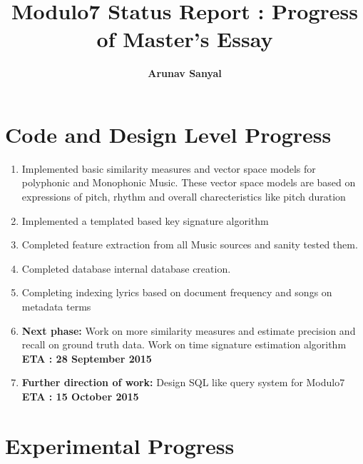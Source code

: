\documentclass[11pt]{article}
\begin{document}
\title{Modulo7 Status Report : Progress of Master's Essay}
\author{\textbf{Arunav Sanyal}}

\maketitle


\section*{Code and Design Level Progress}

\begin{enumerate}
\item Implemented basic similarity measures and vector space models for polyphonic and Monophonic Music. These vector space models are based on expressions of pitch, rhythm and overall charecteristics like pitch duration
\item Implemented a templated based key signature algorithm
\item Completed feature extraction from all Music sources and sanity tested them.
\item Completed database internal database creation. 
\item Completing indexing lyrics based on document frequency and songs on metadata terms
\item \textbf{Next phase:} Work on more similarity measures and estimate precision and recall on ground truth data. Work on time signature estimation algorithm \textbf{ETA : 28 September 2015}
\item \textbf{Further direction of work:} Design SQL like query system for Modulo7 \textbf{ETA : 15 October 2015}
\end{enumerate}


\section*{Experimental Progress}
\end{document}
